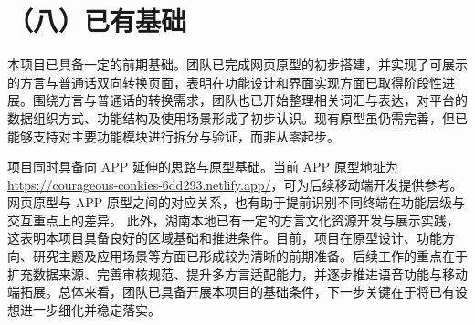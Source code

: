 \documentclass[UTF8]{ctexart}
\begin{document}
\section*{（八）已有基础}

本项目已具备一定的前期基础。团队已完成网页原型的初步搭建，并实现了可展示的方言与普通话双向转换页面，表明在功能设计和界面实现方面已取得阶段性进展。围绕方言与普通话的转换需求，团队也已开始整理相关词汇与表达，对平台的数据组织方式、功能结构及使用场景形成了初步认识。现有原型虽仍需完善，但已能够支持对主要功能模块进行拆分与验证，而非从零起步。

项目同时具备向 APP 延伸的思路与原型基础。当前 APP 原型地址为 \url{https://courageous-conkies-6dd293.netlify.app/}，可为后续移动端开发提供参考。网页原型与 APP 原型之间的对应关系，也有助于提前识别不同终端在功能层级与交互重点上的差异。
此外，湖南本地已有一定的方言文化资源开发与展示实践，这表明本项目具备良好的区域基础和推进条件。目前，项目在原型设计、功能方向、研究主题及应用场景等方面已形成较为清晰的前期准备。后续工作的重点在于扩充数据来源、完善审核规范、提升多方言适配能力，并逐步推进语音功能与移动端拓展。总体来看，团队已具备开展本项目的基础条件，下一步关键在于将已有设想进一步细化并稳定落实。

\printbibliography[title={参考文献}]
\end{document}
